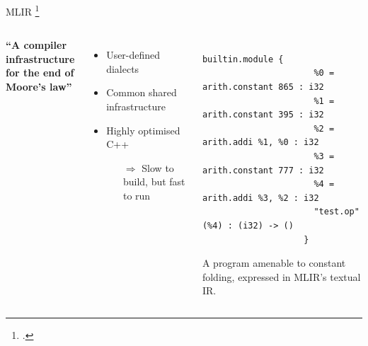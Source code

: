 \documentclass[10pt,aspectratio=169]{beamer}
\renewcommand{\cite}{\footcite}
\begin{document}
\begin{frame}[fragile]{MLIR \cite{lattnerMLIRScalingCompiler2021a}}
    \begin{columns}[T,onlytextwidth]
            {\large \vspace{0.5em} \textbf{``A compiler infrastructure\\ for the 
            end of Moore's law''} \vspace{0.5em}}
            \vspace{1.25em}
            \begin{itemize}
                \itemindent=-13pt
                \item User-defined dialects
                \item Common shared infrastructure
                \item Highly optimised C++
                \begin{itemize}
                    \itemindent=-13pt
                    \item[$\Rightarrow$] Slow to build, but fast to run
                \end{itemize}
            \end{itemize}
            \begin{listing}[H]
                \centering
                \begin{verbatim}
                    builtin.module {
                      %0 = arith.constant 865 : i32
                      %1 = arith.constant 395 : i32
                      %2 = arith.addi %1, %0 : i32
                      %3 = arith.constant 777 : i32
                      %4 = arith.addi %3, %2 : i32
                      "test.op"(%4) : (i32) -> ()
                    }
                \end{verbatim}
                \caption{A program amenable to constant folding, expressed in MLIR's textual IR.}
                \label{listing:mlir-ir}
            \end{listing}
    \end{columns}
\end{frame}
\end{document}

